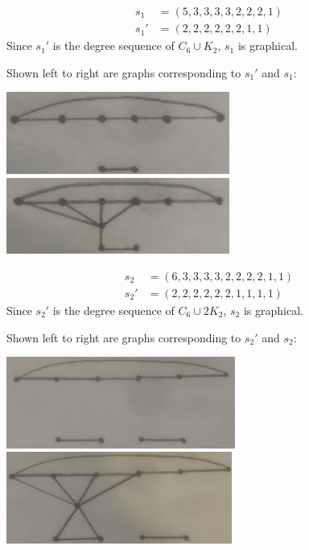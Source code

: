 \documentclass[12pt]{article}
\begin{document}
\newpage{}

\begin{align*}
    s_1  &= (5,3,3,3,3,2,2,2,1) \\
    s_1' &=   (2,2,2,2,2,2,1,1)
\end{align*} Since $s_1'$ is the degree sequence of $C_6 \cup K_2$, $s_1$ is graphical.

Shown left to right are graphs corresponding to $s_1'$ and $s_1$:
\begin{center}
\includegraphics[height=2.7cm]{IMG-0792.JPG}
\includegraphics[height=2.5cm]{IMG-0793.JPG}
\end{center}

\begin{align*}
    s_2  &= (6,3,3,3,3,2,2,2,2,1,1) \\
    s_2' &=   (2,2,2,2,2,2,1,1,1,1)
\end{align*} Since $s_2'$ is the degree sequence of $C_6 \cup 2K_2$, $s_2$ is graphical.

Shown left to right are graphs corresponding to $s_2'$ and $s_2$:
\begin{center}
\includegraphics[height=3cm]{IMG-0790.JPG}
\includegraphics[height=3cm]{IMG-0791.JPG}
\end{center}
\end{document}

